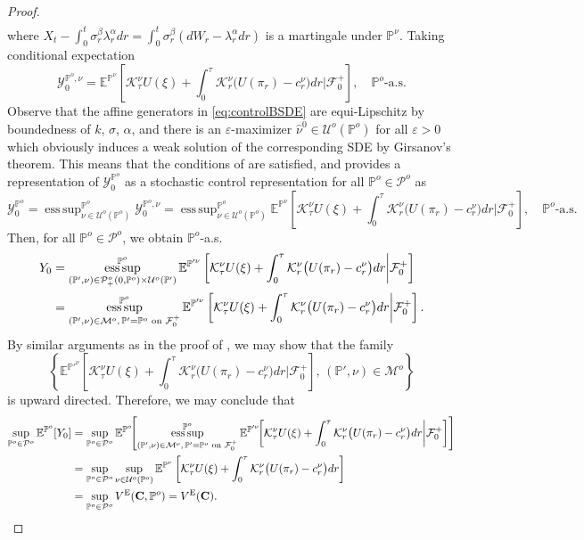 \documentclass[11pt,a4paper]{article}
\numberwithin{equation}{section}
\def\dbE{\mathbb{E}}
\def\dbP{\mathbb{P}}
\newcommand{\cF}{\mathcal{F}}
\newcommand{\cK}{\mathcal{K}}
\newcommand{\cM}{\mathcal{M}}
\newcommand{\cP}{\mathcal{P}}
\newcommand{\cU}{\mathcal{U}}
\newcommand{\cY}{\mathcal{Y}}
\newcommand{\Cbf}{\mathbf{C}}
\def\eps{\varepsilon}
\DeclareMathOperator*{\esssup}{ess\,sup}
\theoremstyle{definition}
\begin{document}
\begin{proof}
\begin{align*}
     \end{align*}
     where $X_t-\int_0^t\sigma_r^\beta\lambda^\alpha_rdr=\int_0^t\sigma_r^\beta(dW_r-\lambda^\alpha_rdr)$ is a martingale under $\dbP^\nu$. 
    Taking conditional expectation 
     $$ \cY_0^{\dbP^o,\nu} = \dbE^{\dbP^\nu}\left[\cK_\tau^\nu U(\xi) + \int_0^\tau\cK_r^\nu\big(U(\pi_r)-c^\nu_r\big)dr\bigg|\cF_0^+\right], \quad \dbP^o\mbox{-a.s.} $$
    Observe that the affine generators in \eqref{eq:controlBSDE} are equi-Lipschitz by boundedness of $k$, $\sigma$, $\alpha$, and there is an $\eps$-maximizer $\widehat\nu^0\in\cU^o(\dbP^o)$ for all $\eps>0$ 
      which obviously induces a weak solution of the corresponding SDE by Girsanov's theorem. 
    This means that the conditions of \cite[Corollary 3.1]{EKPQ97} are satisfied, and provides a representation of $\cY_0^{\dbP^o}$ as a stochastic control representation for all $\dbP^o\in\cP^o$ as 
      \begin{equation}  \label{eq:controlBSDE1}
        \cY_0^{\dbP^o} = \esssup^{\dbP^o}_{\nu\in\cU^o(\dbP^o)}\cY_0^{\dbP^o,\nu} 
                       = \esssup^{\dbP^o}_{\nu\in\cU^o(\dbP^o)}\dbE^{\dbP^\nu}\left[\cK_\tau^\nu U(\xi) + \int_0^\tau\cK_r^\nu\big(U(\pi_r)-c^\nu_r\big)dr\bigg|\cF_0^+\right], \quad \dbP^o\mbox{-a.s.}
      \end{equation}
    Then, for all $\dbP^o\in\cP^o$, we obtain $\dbP^o$-a.s.
      \begin{align*}
        Y_0 &= \esssup^{\dbP^o}_{(\dbP',\nu)\in\cP^o_+(0,\dbP^o)\times\cU^o(\dbP')}\dbE^{\dbP'^{\nu}}\left[\cK_\tau^\nu U(\xi) + \int_0^\tau\cK_r^\nu\big(U(\pi_r)-c^\nu_r\big)dr\bigg|\cF_0^+\right]  \\
            &= \esssup^{\dbP^o}_{(\dbP',\nu)\in\cM^o,\,\dbP'=\dbP^o \textnormal{ on }\cF_0^+}\dbE^{\dbP'^{\nu}}\left[\cK_\tau^\nu U(\xi) + \int_0^\tau\cK_r^\nu\big(U(\pi_r)-c^\nu_r\big)dr\bigg|\cF_0^+\right].
      \end{align*}
    By similar arguments as in the proof of \cite[Lemma 3.5]{PTZ18}, we may show that the family 
      $$ \left\{\dbE^{\dbP'^{\nu}}\left[\cK_\tau^\nu U(\xi) + \int_0^\tau\cK_r^\nu\big(U(\pi_r)-c^\nu_r\big)dr\bigg|\cF_0^+\right],\, (\dbP',\nu)\in\cM^o\right\} $$
      is upward directed. 
    Therefore, we may conclude that
     \begin{align*}
       \sup_{\dbP^o\in\cP^o}\dbE^{\dbP^o}[Y_0] 
         &= \sup_{\dbP^o\in\cP^o}\dbE^{\dbP^o}\!\!\left[\esssup^{\dbP^o}_{(\dbP',\nu)\in\cM^o,\,\dbP'=\dbP^o \textnormal{ on }\cF_0^+}\dbE^{\dbP'^{\nu}}\!\!\left[\cK_\tau^\nu U(\xi) + \int_0^\tau\cK_r^\nu\big(U(\pi_r)-c^\nu_r\big)dr\bigg|\cF_0^+\right]\right] \\
         &= \sup_{\dbP^o\in\cP^o}\sup_{\nu\in \cU^o(\dbP^o)}\dbE^{\dbP^\nu}\left[\cK_\tau^\nu U(\xi) + \int_0^\tau\cK_r^\nu\big(U(\pi_r)-c^\nu_r\big)dr\right]  \\
         &= \sup_{\dbP^o\in\cP^o}V^{\rm E}(\Cbf,\dbP^o) = V^{\rm E}(\Cbf).
     \end{align*}
    

\end{proof}
\end{document}
